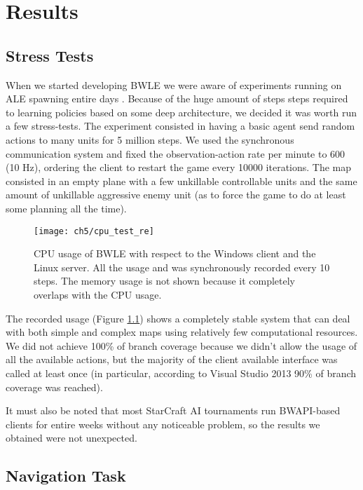 \chapter{Results}

\section{Stress Tests}

When we started developing BWLE we were aware of experiments running on ALE
spawning entire days \citep{mnih2015human}. Because of the huge amount of steps
steps required to learning policies based on some deep architecture, we decided
it was worth run a few stress-tests. The experiment consisted in having a basic
agent send random actions to many units for 5 million steps. We used the
synchronous communication system and fixed the observation-action rate per
minute to 600 (10 Hz), ordering the client to restart the game every 10000
iterations. The map consisted in an empty plane with a few unkillable
controllable units and the same amount of unkillable aggressive enemy unit (as
to force the game to do at least some planning all the time).

\begin{figure}[h]
    \centering
    \texttt{[image: ch5/cpu\_test\_re]}
    \caption{CPU usage of BWLE with respect to the Windows client and the Linux
      server. All the usage and was synchronously recorded every 10 steps. The
      memory usage is not shown because it completely overlaps with the CPU
      usage.}
    \label{fig:fst_usage}
\end{figure}

The recorded usage (Figure \ref{fig:fst_usage}) shows a completely stable system
that can deal with both simple and complex maps using relatively few
computational resources. We did not achieve 100\% of branch coverage because we
didn't allow the usage of all the available actions, but the majority of the
client available interface was called at least once (in particular, according to
Visual Studio 2013 90\% of branch coverage was reached).

It must also be noted that most StarCraft AI tournaments
\citep{ontanon2013survey} run BWAPI-based clients for entire weeks without any
noticeable problem, so the results we obtained were not unexpected.

\section{Navigation Task}

